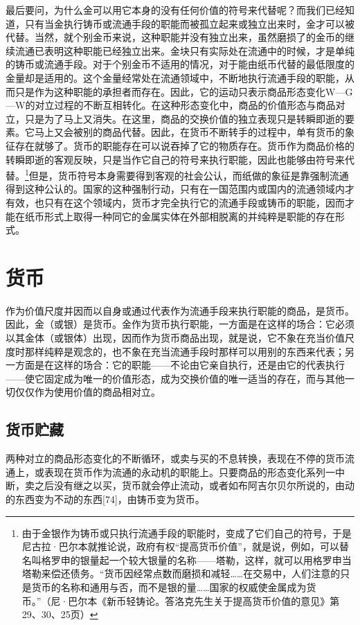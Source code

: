 \documentclass{ctexbook}
\begin{document}
        最后要问，为什么金可以用它本身的没有任何价值的符号来代替呢？而我们已经知道，只有当金执行铸币或流通手段的职能而被孤立起来或独立出来时，金才可以被代替。当然，就个别金币来说，这种职能并没有独立出来，虽然磨损了的金币的继续流通已表明这种职能已经独立出来。金块只有实际处在流通中的时候，才是单纯的铸币或流通手段。对于个别金币不适用的情况，对于能由纸币代替的最低限度的金量却是适用的。这个金量经常处在流通领域中，不断地执行流通手段的职能，从而只是作为这种职能的承担者而存在。因此，它的运动只表示商品形态变化W—G—W的对立过程的不断互相转化。在这种形态变化中，商品的价值形态与商品对立，只是为了马上又消失。在这里，商品的交换价值的独立表现只是转瞬即逝的要素。它马上又会被别的商品代替。因此，在货币不断转手的过程中，单有货币的象征存在就够了。货币的职能存在可以说吞掉了它的物质存在。货币作为商品价格的转瞬即逝的客观反映，只是当作它自己的符号来执行职能，因此也能够由符号来代替。\footnote{由于金银作为铸币或只执行流通手段的职能时，变成了它们自己的符号，于是尼古拉·巴尔本就推论说，政府有权“提高货币价值”，就是说，例如，可以替名叫格罗申的银量起一个较大银量的名称——塔勒，这样，就可以用格罗申当塔勒来偿还债务。“货币因经常点数而磨损和减轻……在交易中，人们注意的只是货币的名称和通用与否，而不是银的量……国家的权威使金属成为货币。”（尼·巴尔本《新币轻铸论。答洛克先生关于提高货币价值的意见》第29、30、25页）}但是，货币符号本身需要得到客观的社会公认，而纸做的象征是靠强制流通得到这种公认的。国家的这种强制行动，只有在一国范围内或国内的流通领域内才有效，也只有在这个领域内，货币才完全执行它的流通手段或铸币的职能，因而才能在纸币形式上取得一种同它的金属实体在外部相脱离的并纯粹是职能的存在形式。
        
    \section{货币}

    作为价值尺度并因而以自身或通过代表作为流通手段来执行职能的商品，是货币。因此，金（或银）是货币。金作为货币执行职能，一方面是在这样的场合：它必须以其金体（或银体）出现，因而作为货币商品出现，就是说，它不象在充当价值尺度时那样纯粹是观念的，也不象在充当流通手段时那样可以用别的东西来代表；另一方面是在这样的场合：它的职能——不论由它亲自执行，还是由它的代表执行——使它固定成为唯一的价值形态，成为交换价值的唯一适当的存在，而与其他一切仅仅作为使用价值的商品相对立。

        \subsection{货币贮藏}
        两种对立的商品形态变化的不断循环，或卖与买的不息转换，表现在不停的货币流通上，或表现在货币作为流通的永动机的职能上。只要商品的形态变化系列一中断，卖之后没有继之以买，货币就会停止流动，或者如布阿吉尔贝尔所说的，由动的东西变为不动的东西[74]，由铸币变为货币。
\end{document}
